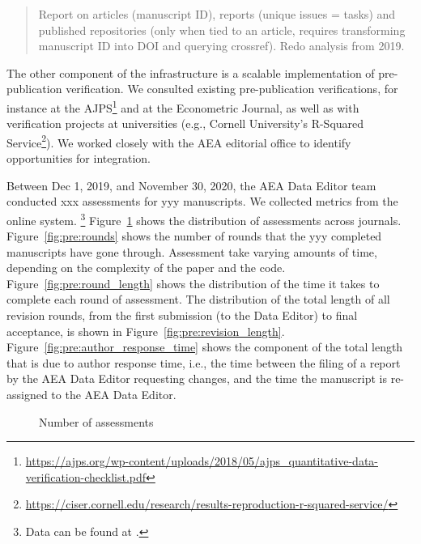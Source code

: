 \documentclass[PP]{AEA}
\newcommand{\urlcite}[2]{#2\footnote{\url{#1}}}
\begin{document}
\begin{quote}
Report on articles (manuscript ID), reports (unique issues = tasks) and published repositories (only when tied to an article, requires transforming manuscript ID into DOI and querying crossref). Redo analysis from 2019.

\end{quote}

The other component of the infrastructure is a scalable implementation of pre-publication verification. We consulted existing pre-publication verifications, for instance at the \urlcite{https://ajps.org/wp-content/uploads/2018/05/ajps_quantitative-data-verification-checklist.pdf}{\ac{AJPS}} and at the Econometric Journal, as well as with verification projects at universities (e.g., Cornell University's \urlcite{https://ciser.cornell.edu/research/results-reproduction-r-squared-service/}{R-Squared Service}). We worked closely with the AEA editorial office to identify opportunities for integration. 



Between Dec 1, 2019, and November 30, 2020, the AEA Data Editor team conducted 
\newcommand{\jiramcs}{yyy}
xxx assessments for \jiramcs{} manuscripts.
%
We collected metrics from the online system.%
\footnote{Data  can be found at \citet{E117876V1}.}
Figure~\ref{fig:pre:assessments_journal} shows the distribution of  assessments across journals. Figure~\ref{fig:pre:rounds} shows the number of rounds that the \jiramcs{} completed manuscripts have gone through. Assessment take varying amounts of time, depending on the complexity of the paper and the code. Figure~\ref{fig:pre:round_length} shows the distribution of the time it takes to complete each round of assessment. The distribution of the total length of all revision rounds, from the first submission (to the Data Editor) to final acceptance, is shown in Figure~\ref{fig:pre:revision_length}. Figure~\ref{fig:pre:author_response_time} shows the component of the total length that is due to author response time, i.e., the time between the filing of a report by the AEA Data Editor requesting changes, and the time the manuscript is re-assigned to the AEA Data Editor. 

\begin{figure}
    \centering
    \caption{Number of assessments}
    \label{fig:pre:assessments_journal}
\end{figure}
\end{document}
